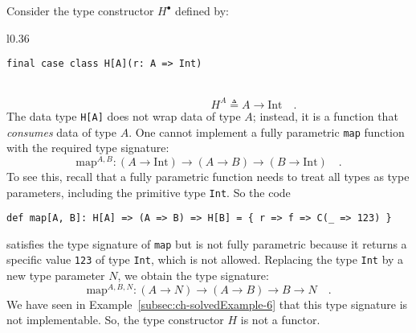 Consider the type constructor $H^{\bullet}$ defined by:

\begin{wrapfigure}{l}{0.36\columnwidth}%
\vspace{-0.8\baselineskip}
\begin{lstlisting}
final case class H[A](r: A => Int)
\end{lstlisting}

\vspace{-0.8\baselineskip}
\end{wrapfigure}%

~\vspace{-1.08\baselineskip}
\[
\quad\quad\quad\quad\quad\quad\quad\quad H^{A}\triangleq A\rightarrow\text{Int}\quad.
\]
The data type \lstinline!H[A]! does not wrap data of type $A$; instead,
it is a function that \emph{consumes} data of type $A$. One cannot
implement a fully parametric \lstinline!map! function with the required
type signature:
\[
\text{map}^{A,B}:\left(A\rightarrow\text{Int}\right)\rightarrow\left(A\rightarrow B\right)\rightarrow\left(B\rightarrow\text{Int}\right)\quad.
\]
To see this, recall that a fully
parametric function needs to treat all types as type parameters, including
the primitive type \lstinline!Int!. So the code
\begin{lstlisting}
def map[A, B]: H[A] => (A => B) => H[B] = { r => f => C(_ => 123) }
\end{lstlisting}
satisfies the type signature of \lstinline!map! but is not fully
parametric because it returns a specific value \lstinline!123! of
type \lstinline!Int!, which is not allowed. Replacing the type \lstinline!Int!
by a new type parameter $N$, we obtain the type signature:
\[
\text{map}^{A,B,N}:\left(A\rightarrow N\right)\rightarrow\left(A\rightarrow B\right)\rightarrow B\rightarrow N\quad.
\]
We have seen in Example~\ref{subsec:ch-solvedExample-6} that this
type signature is not implementable. So, the type constructor $H$
is not a functor.

